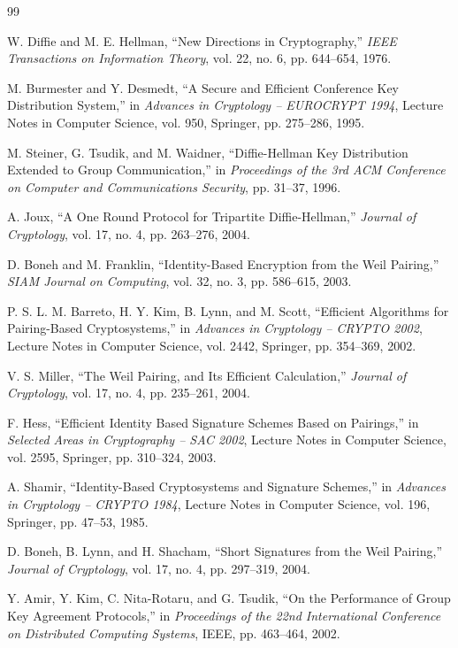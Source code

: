 \documentclass[12pt,a4paper]{report}
\begin{document}
\begin{thebibliography}{99}

W. Diffie and M. E. Hellman,
``New Directions in Cryptography,''
\textit{IEEE Transactions on Information Theory},
vol. 22, no. 6, pp. 644--654, 1976.

M. Burmester and Y. Desmedt,
``A Secure and Efficient Conference Key Distribution System,''
in \textit{Advances in Cryptology -- EUROCRYPT 1994},
Lecture Notes in Computer Science, vol. 950,
Springer, pp. 275--286, 1995.

M. Steiner, G. Tsudik, and M. Waidner,
``Diffie-Hellman Key Distribution Extended to Group Communication,''
in \textit{Proceedings of the 3rd ACM Conference on Computer and Communications Security},
pp. 31--37, 1996.

A. Joux,
``A One Round Protocol for Tripartite Diffie-Hellman,''
\textit{Journal of Cryptology},
vol. 17, no. 4, pp. 263--276, 2004.

D. Boneh and M. Franklin,
``Identity-Based Encryption from the Weil Pairing,''
\textit{SIAM Journal on Computing},
vol. 32, no. 3, pp. 586--615, 2003.

P. S. L. M. Barreto, H. Y. Kim, B. Lynn, and M. Scott,
``Efficient Algorithms for Pairing-Based Cryptosystems,''
in \textit{Advances in Cryptology -- CRYPTO 2002},
Lecture Notes in Computer Science, vol. 2442,
Springer, pp. 354--369, 2002.

V. S. Miller,
``The Weil Pairing, and Its Efficient Calculation,''
\textit{Journal of Cryptology},
vol. 17, no. 4, pp. 235--261, 2004.

F. Hess,
``Efficient Identity Based Signature Schemes Based on Pairings,''
in \textit{Selected Areas in Cryptography -- SAC 2002},
Lecture Notes in Computer Science, vol. 2595,
Springer, pp. 310--324, 2003.

A. Shamir,
``Identity-Based Cryptosystems and Signature Schemes,''
in \textit{Advances in Cryptology -- CRYPTO 1984},
Lecture Notes in Computer Science, vol. 196,
Springer, pp. 47--53, 1985.

D. Boneh, B. Lynn, and H. Shacham,
``Short Signatures from the Weil Pairing,''
\textit{Journal of Cryptology},
vol. 17, no. 4, pp. 297--319, 2004.

Y. Amir, Y. Kim, C. Nita-Rotaru, and G. Tsudik,
``On the Performance of Group Key Agreement Protocols,''
in \textit{Proceedings of the 22nd International Conference on Distributed Computing Systems},
IEEE, pp. 463--464, 2002.


\end{thebibliography}
\end{document}
